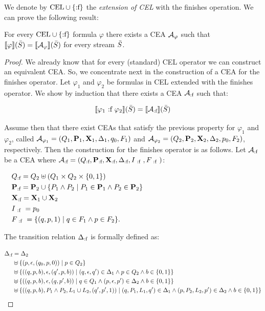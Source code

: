 We denote by $\text{CEL} \cup \{\text{:f}\}$ the \emph{extension of CEL} with the finishes operation. We can prove the following result:

\begin{theorem} \label{theo:CELfinishes}
	For every $\text{CEL} \cup \{\text{:f}\}$ formula $\varphi$ there exists a CEA $\mathcal{A}_\varphi$ such that $\sem{\varphi}(\Stream) = \sem{\cA_\varphi}(\Stream)$ for every stream $\bar{S}$.
\end{theorem}

\begin{proof}
	We already know that for every (standard) CEL operator we can construct an equivalent CEA. So, we concentrate next in the construction of a CEA for the finishes operator.
	Let $\varphi_1$ and $\varphi_2$ be formulas in CEL extended with the finishes operator. We show by induction that there exists a CEA $\mathcal{A}_{\text{:f}}$ such that:
	
	$$\sem{\varphi_1 \finishes \varphi_2}(\Stream) = \sem{\cAfinishes}(\Stream)$$
	
	Assume then that there exist CEAs that satisfy the previous property for $\varphi_1$ and $\varphi_2$, called $\mathcal{A}_{\varphi_1} = (Q_1, \mathbf{P}_1, \mathbf{X}_1, \Delta_1, q_0, F_1)$ and $\mathcal{A}_{\varphi_2} = (Q_2, \mathbf{P}_2, \mathbf{X}_2, \Delta_2, p_0, F_2)$, respectively. 
	Then the construction for the finishes operator is as follows.
	Let $\mathcal{A}_{\text{:f}}$ be a CEA where $\mathcal{A}_{\text{:f}} = (Q_{\text{:f}}, \mathbf{P}_{\text{:f}}, \mathbf{X}_{\text{:f}}, \Delta_{\text{:f}}, I_{~\text{:f}~}, F_{~\text{:f}~})$:
	
	$$\begin{aligned}[t] 		 		
		& \Qfinishes = Q_2 \uplus (Q_1 \times Q_2 \times \{0, 1\}) \\ 		 		
		& \Pfinishes = \SETP_2 \cup \{ P_1 \land P_2 \mid P_1 \in \SETP_1 \land P_2 \in \SETP_2 \} \hspace*{155px}\\ 		 		
		& \Xfinishes  = \SETX_1 \cup \SETX_2 \\ 		 		
		& I_{\finishes} = p_0\\ 		 		
		& F_{\finishes} = \{ (q, p, 1) \mid q \in F_1 \land p \in F_2 \}. 	 	
	\end{aligned}$$
	
	The transition relation $\Delta_{\text{:f}}$ is formally defined as:
	
	$$\begin{aligned}[t] 		 		
		\Delta_{\text{:f}} 
		& = \Delta_2 \\ 		 		
		& \uplus \{(p, \epsilon, (q_0, p, 0)) \mid p \in Q_2\}\\
		& \uplus \{((q, p, b), \epsilon, (q', p, b)) \mid (q, \epsilon, q') \in \Delta_1 \land p \in Q_2 \land b \in \{0, 1\}\}  \\ 		 		
		& \uplus \{((q, p, b), \epsilon, (q, p', b)) \mid q \in Q_1 \land (p, \epsilon, p') \in \Delta_2 \land b \in \{0, 1\}\}  \\ 		 		
		& \uplus \{((q, p, b), P_1 \land P_2, L_1 \cup L_2, (q', p', 1)) \mid (q, P_1, L_1, q') \in \Delta_1 \land (p, P_2, L_2, p') \in \Delta_2 \land b \in \{0, 1\}\} 
	\end{aligned}$$
	

\end{proof}
